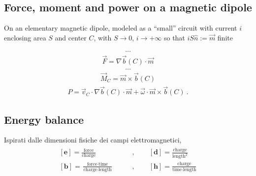 \documentclass[letterpaper,10pt,english]{jupyterBook}
\begin{document}
\subsection{Force, moment and power on a magnetic dipole}
\label{\detokenize{ch/forces-moments-on-charges:force-moment-and-power-on-a-magnetic-dipole}}
\sphinxAtStartPar
On an elementary magnetic dipole, modeled as a “small” circuit with current \(i\) enclosing area \(S\) and center \(C\), with \(S \rightarrow 0\), \(i \rightarrow + \infty\) so that \(i S \hat{n} := \vec{m}\) finite

\sphinxAtStartPar
{}
\begin{equation*}
\begin{split}\dots\end{split}
\end{equation*}\begin{equation*}
\begin{split}\vec{F} = \nabla \vec{b}(C) \cdot \vec{m}\end{split}
\end{equation*}
\sphinxAtStartPar
{}
\begin{equation*}
\begin{split}\dots\end{split}
\end{equation*}\begin{equation*}
\begin{split}\vec{M}_C = \vec{m} \times \vec{b}(C)\end{split}
\end{equation*}
\sphinxAtStartPar
{}
\begin{equation*}
\begin{split}P = \vec{v}_C \cdot \nabla \vec{b}(C) \cdot \vec{m} + \vec{\omega} \cdot \vec{m} \times \vec{b}(C) \ .\end{split}
\end{equation*}

\subsection{Energy balance}
\label{\detokenize{ch/forces-moments-on-charges:energy-balance}}
\sphinxAtStartPar
{} 

\sphinxAtStartPar
Ispirati dalle dimensioni fisiche dei campi elettromagnetici,
\begin{equation*}
\begin{split}\begin{aligned}
\left[\mathbf{e}\right] = \frac{\text{force}}{\text{charge}} \qquad & , \qquad
[\mathbf{d}] = \frac{\text{charge}}{\text{length}^2} \\
[\mathbf{b}] = \frac{\text{force}\cdot\text{time}}{\text{charge}\cdot\text{length}} \qquad & , \qquad
[\mathbf{h}] = \frac{\text{charge}}{\text{time} \cdot \text{length}}
\end{aligned}\end{split}
\end{equation*}
\end{document}
